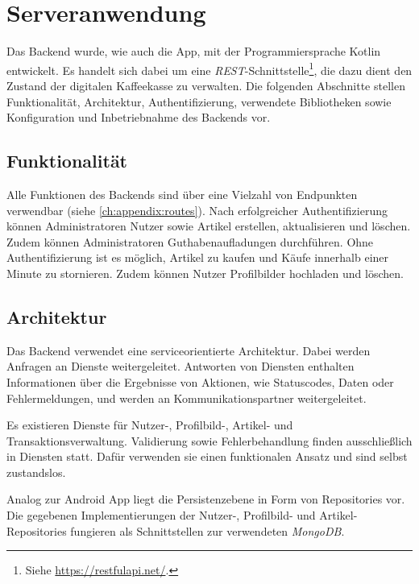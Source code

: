\chapter{Serveranwendung}
\label{ch:backend}
Das Backend wurde, wie auch die App, mit der Programmiersprache Kotlin entwickelt.
Es handelt sich dabei um eine \textit{REST}-Schnittstelle\footnote{Siehe \url{https://restfulapi.net/}.}, die dazu dient den Zustand der digitalen Kaffeekasse zu verwalten.
Die folgenden Abschnitte stellen Funktionalität, Architektur, Authentifizierung, verwendete Bibliotheken sowie Konfiguration und Inbetriebnahme des Backends vor.

\section{Funktionalität}
\label{sec:backend:functionality}
Alle Funktionen des Backends sind über eine Vielzahl von Endpunkten verwendbar (siehe \autoref{ch:appendix:routes}).
Nach erfolgreicher Authentifizierung können Administratoren Nutzer sowie Artikel erstellen, aktualisieren und löschen.
Zudem können Administratoren Guthabenaufladungen durchführen.
Ohne Authentifizierung ist es möglich, Artikel zu kaufen und Käufe innerhalb einer Minute zu stornieren.
Zudem können Nutzer Profilbilder hochladen und löschen.

\section{Architektur}
\label{sec:backend:architecture}
Das Backend verwendet eine serviceorientierte Architektur.
Dabei werden Anfragen an Dienste weitergeleitet.
Antworten von Diensten enthalten Informationen über die Ergebnisse von Aktionen, wie Statuscodes, Daten oder Fehlermeldungen, und werden an Kommunikationspartner weitergeleitet.

Es existieren Dienste für Nutzer-, Profilbild-, Artikel- und Transaktionsverwaltung.
Validierung sowie Fehlerbehandlung finden ausschließlich in Diensten statt.
Dafür verwenden sie einen funktionalen Ansatz und sind selbst zustandslos.

Analog zur Android App liegt die Persistenzebene in Form von Repositories vor.
Die gegebenen Implementierungen der Nutzer-, Profilbild- und Artikel-Repositories fungieren als Schnittstellen zur verwendeten \textit{MongoDB}.

